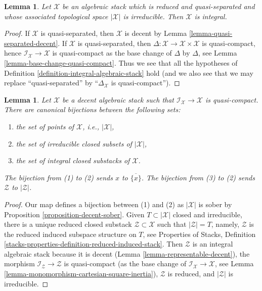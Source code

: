 \documentclass{stacks-project}
\theoremstyle{plain}
\newtheorem{lemma}[subsection]{Lemma}
\theoremstyle{definition}
\theoremstyle{remark}
\numberwithin{equation}{subsection}
\begin{document}
\begin{lemma}
\label{lemma-totaro-case}
Let $\mathcal{X}$ be an algebraic stack which is reduced and quasi-separated
and whose associated topological space $|\mathcal{X}|$ is irreducible.
Then $\mathcal{X}$ is integral.
\end{lemma}

\begin{proof}
If $\mathcal{X}$ is quasi-separated, then $\mathcal{X}$ is decent
by Lemma \ref{lemma-quasi-separated-decent}.
If $\mathcal{X}$ is quasi-separated, then
$\Delta : \mathcal{X} \to \mathcal{X} \times \mathcal{X}$ is quasi-compact,
hence $\mathcal{I}_\mathcal{X} \to \mathcal{X}$ is quasi-compact
as the base change of $\Delta$ by $\Delta$, see
Lemma \ref{lemma-base-change-quasi-compact}.
Thus we see that all the hypotheses of
Definition \ref{definition-integral-algebraic-stack} hold
(and we also see that we may replace ``quasi-separated'' by
``$\Delta_\mathcal{X}$ is quasi-compact'').
\end{proof}

\begin{lemma}
\label{lemma-decent-irreducible-closed}
Let $\mathcal{X}$ be a decent algebraic stack such that
$\mathcal{I}_\mathcal{X} \to \mathcal{X}$ is quasi-compact.
There are canonical bijections between the following sets:
\begin{enumerate}
\item the set of points of $\mathcal{X}$, i.e., $|\mathcal{X}|$,
\item the set of irreducible closed subsets of $|\mathcal{X}|$,
\item the set of integral closed substacks of $\mathcal{X}$.
\end{enumerate}
The bijection from (1) to (2) sends $x$ to $\overline{\{x\}}$.
The bijection from (3) to (2) sends $\mathcal{Z}$ to $|\mathcal{Z}|$.
\end{lemma}

\begin{proof}
Our map defines a bijection between (1) and (2) as $|\mathcal{X}|$ is
sober by  Proposition \ref{proposition-decent-sober}.
Given $T \subset |\mathcal{X}|$ closed and irreducible, there is a
unique reduced closed substack $\mathcal{Z} \subset \mathcal{X}$
such that $|\mathcal{Z}| = T$, namely, $\mathcal{Z}$
is the reduced induced subspace structure on $T$, see
Properties of Stacks, Definition
\ref{stacks-properties-definition-reduced-induced-stack}.
Then $\mathcal{Z}$ is an integral algebraic stack because it is
decent (Lemma \ref{lemma-representable-decent}), the
morphism $\mathcal{I}_\mathcal{Z} \to \mathcal{Z}$ is quasi-compact
(as the base change of $\mathcal{I}_\mathcal{X} \to \mathcal{X}$, see
Lemma \ref{lemma-monomorphism-cartesian-square-inertia}),
$\mathcal{Z}$ is reduced, and $|\mathcal{Z}|$ is irreducible.
\end{proof}
\end{document}
